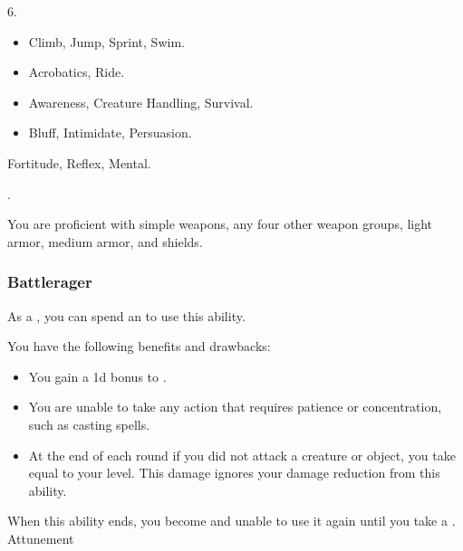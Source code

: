          6.

        \begin{itemize}
            \item {} Climb, Jump, Sprint, Swim.
            \item {} Acrobatics, Ride.
            \item {} Awareness, Creature Handling, Survival.
            \item {} Bluff, Intimidate, Persuasion.
        \end{itemize}

          Fortitude,  Reflex,  Mental.

         .

        You are proficient with simple weapons, any four other weapon groups, light armor, medium armor, and shields.

        \subsubsection{Battlerager}\label{Rage}

            As a , you can spend an  to use this ability.
            \begin{ability}
                \begin{spelleffects}
                    \spelleffect You have the following benefits and drawbacks:
                    \begin{itemize}
                        \item You gain a \plus1d bonus to .
                        \item You are unable to take any action that requires patience or concentration, such as casting spells.
                        \item At the end of each round if you did not attack a creature or object, you take  equal to your level.
                            This damage ignores your damage reduction from this ability.
                    \end{itemize}
                    \spellspecial When this ability ends, you become \fatigued and unable to use it again until you take a .
                    \spelldur Attunement
                \end{spelleffects}
            \end{ability}

